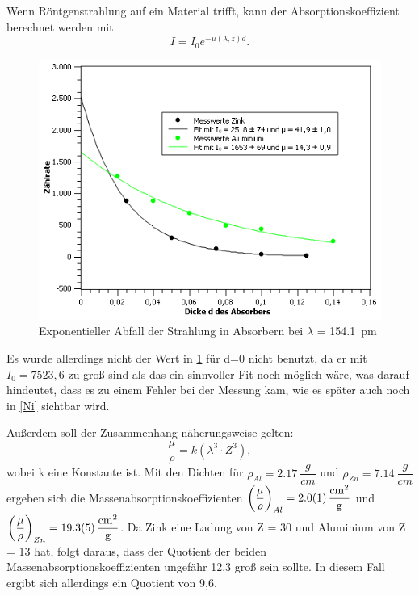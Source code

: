 \documentclass[
	a4paper,
	12pt,
	pagesize,
	ngerman
]{scrartcl}
\begin{document}
 Wenn Röntgenstrahlung auf ein Material trifft, kann der Absorptionskoeffizient berechnet werden mit
\begin{equation}
I = I_{0} e^{- \mu(\lambda,z) d}.
\label{Absorp}
\end{equation}

\begin{figure}[h!]
	\centering
	\includegraphics[scale = 1]{expo.png} 
	\caption{Exponentieller Abfall der Strahlung in Absorbern bei $\lambda$ = \SI{154,1}{pm}}
	\label{expo}
\end{figure}

Es wurde allerdings nicht der Wert in \cref{expo} für d=0 nicht benutzt, da er mit $I_{0} = 7523,6$ zu groß sind als das ein sinnvoller Fit noch möglich wäre, was darauf hindeutet, dass es zu einem Fehler bei der Messung kam, wie es später auch noch in \cref{Ni} sichtbar wird.

Außerdem soll der Zusammenhang näherungsweise gelten:
\begin{equation}
\dfrac{\mu}{\rho} = k(\lambda^{3} \cdot Z^{3}),
\label{Z}
\end{equation}
wobei k eine Konstante ist. Mit den Dichten für $\rho_{Al} = \SI{2,17}{\dfrac{g}{cm}}$ und $\rho_{Zn} = \SI{7,14}{\dfrac{g}{cm}}$ ergeben sich die Massenabsorptionskoeffizienten $\left(\dfrac{\mu}{\rho}\right)_{Al} = \SI{2,0 \pm 0,1}{\dfrac{cm^{2}}{g}}$ und $\left(\dfrac{\mu}{\rho}\right)_{Zn} = \SI{19,3 \pm 0,5}{\dfrac{cm^{2}}{g}}$. Da Zink eine Ladung von Z = 30 und Aluminium von Z = 13 hat, folgt daraus, dass der Quotient der beiden Massenabsorptionskoeffizienten ungefähr 12,3 groß sein sollte. In diesem Fall ergibt sich allerdings ein Quotient von 9,6.
\end{document}
